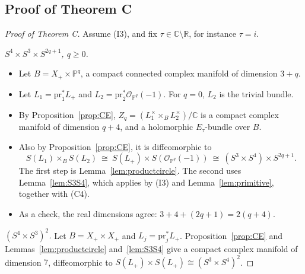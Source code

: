 \documentclass{article}
\theoremstyle{definition}
\theoremstyle{plain}
\newcommand{\R}{\mathbb{R}}
\newcommand{\C}{\mathbb{C}}
\newcommand{\PP}{\mathbb{P}}
\newcommand{\cO}{\mathcal{O}}
\begin{document}
\subsection{Proof of Theorem C}\label{sec:proofC}
\begin{proof}[Proof of Theorem C]
Assume (I3), and fix $\tau\in\C\setminus\R$, for instance $\tau=i$.

\emph{$S^4\times S^3\times S^{2q+1}$, $q\ge0$.}
\begin{itemize}
\item Let $B=X_+\times\PP^q$, a compact connected complex manifold of dimension $3+q$.
\item Let $L_1=\mathrm{pr}_1^*L_+$ and $L_2=\mathrm{pr}_2^*\cO_{\PP^q}(-1)$. For $q=0$, $L_2$ is
  the trivial bundle.
\item By Proposition~\ref{prop:CE}, $Z_q=(L_1^\times\times_BL_2^\times)/\C$ is a compact
  complex manifold of dimension $q+4$, and a holomorphic $E_\tau$-bundle over $B$.
\item Also by Proposition~\ref{prop:CE}, it is diffeomorphic to
  \[
  S(L_1)\times_BS(L_2)\ \cong\ S(L_+)\times S(\cO_{\PP^q}(-1))\ \cong\ (S^3\times S^4)\times S^{2q+1}.
  \]
  The first step is Lemma~\ref{lem:productcircle}. The second uses
  Lemma~\ref{lem:S3S4}, which applies by (I3) and Lemma~\ref{lem:primitive}, together
  with (C4).
\item As a check, the real dimensions agree: $3+4+(2q+1)=2(q+4)$.
\end{itemize}

\emph{$(S^4\times S^3)^2$.} Let $B=X_+\times X_+$ and $L_j=\mathrm{pr}_j^*L_+$.
Proposition~\ref{prop:CE} and Lemmas~\ref{lem:productcircle} and~\ref{lem:S3S4} give a
compact complex manifold of dimension $7$, diffeomorphic to
$S(L_+)\times S(L_+)\cong(S^3\times S^4)^2$.
\end{proof}
\end{document}
